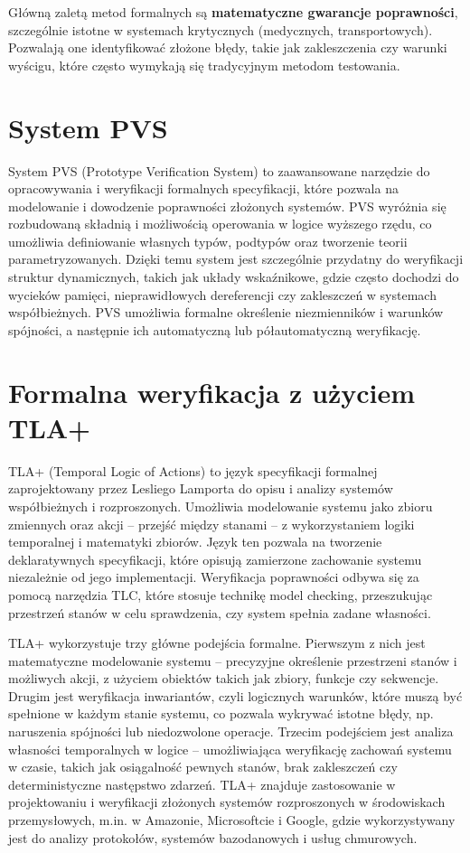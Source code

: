 \documentclass[conference]{IEEEtran}
\begin{document}
        Główną zaletą metod formalnych są \textbf{matematyczne gwarancje poprawności}, szczególnie istotne w systemach krytycznych (medycznych, transportowych).
        Pozwalają one identyfikować złożone błędy, takie jak zakleszczenia czy warunki wyścigu, które często wymykają się tradycyjnym metodom testowania.
    
    \section{System PVS}
    System PVS (Prototype Verification System) to zaawansowane narzędzie do opracowywania i weryfikacji formalnych specyfikacji, które pozwala na modelowanie i dowodzenie poprawności złożonych systemów. 
    PVS wyróżnia się rozbudowaną składnią i możliwością operowania w logice wyższego rzędu, co umożliwia definiowanie własnych typów, podtypów oraz tworzenie teorii parametryzowanych. 
    Dzięki temu system jest szczególnie przydatny do weryfikacji struktur dynamicznych, takich jak układy wskaźnikowe, gdzie często dochodzi do wycieków pamięci, nieprawidłowych dereferencji czy zakleszczeń w systemach współbieżnych. 
    PVS umożliwia formalne określenie niezmienników i warunków spójności, a następnie ich automatyczną lub półautomatyczną weryfikację.
        
    \section{Formalna weryfikacja z użyciem TLA+}
    TLA+ (Temporal Logic of Actions) to język specyfikacji formalnej zaprojektowany przez Lesliego Lamporta do opisu i analizy systemów współbieżnych i rozproszonych. Umożliwia modelowanie systemu jako zbioru zmiennych oraz akcji – przejść między stanami – z wykorzystaniem logiki temporalnej i matematyki zbiorów. Język ten pozwala na tworzenie deklaratywnych specyfikacji, które opisują zamierzone zachowanie systemu niezależnie od jego implementacji. Weryfikacja poprawności odbywa się za pomocą narzędzia TLC, które stosuje technikę model checking, przeszukując przestrzeń stanów w celu sprawdzenia, czy system spełnia zadane własności.

    TLA+ wykorzystuje trzy główne podejścia formalne. Pierwszym z nich jest matematyczne modelowanie systemu – precyzyjne określenie przestrzeni stanów i możliwych akcji, z użyciem obiektów takich jak zbiory, funkcje czy sekwencje. Drugim jest weryfikacja inwariantów, czyli logicznych warunków, które muszą być spełnione w każdym stanie systemu, co pozwala wykrywać istotne błędy, np. naruszenia spójności lub niedozwolone operacje. Trzecim podejściem jest analiza własności temporalnych w logice – umożliwiająca weryfikację zachowań systemu w czasie, takich jak osiągalność pewnych stanów, brak zakleszczeń czy deterministyczne następstwo zdarzeń. TLA+ znajduje zastosowanie w projektowaniu i weryfikacji złożonych systemów rozproszonych w środowiskach przemysłowych, m.in. w Amazonie, Microsoftcie i Google, gdzie wykorzystywany jest do analizy protokołów, systemów bazodanowych i usług chmurowych.
    
\end{document}
